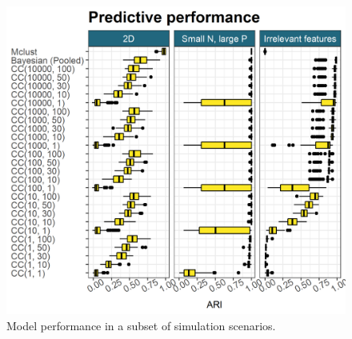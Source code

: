 \documentclass{bioinfo}
\begin{document}
\begin{figure} %
	\centering
	\includegraphics[scale=0.5]{./Images/Simulations/simulation_model_prediction.png}
	\caption{Model performance in a subset of simulation scenarios. }
	\label{fig:simResults}
\end{figure}
\end{document}
